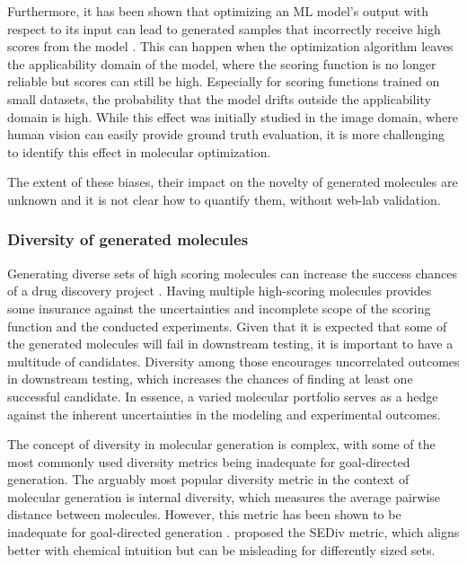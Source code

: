 Furthermore, it has been shown that optimizing an \ac{ML} model's output with respect to its input can
lead to generated samples that incorrectly receive high scores from the model
\citep{szegedyIntriguingPropertiesNeural2014,goodfellowExplainingHarnessingAdversarial2015}.
This can happen when the optimization algorithm leaves the applicability domain of the model, where
the scoring function is no longer reliable but scores can still be high. Especially for scoring
functions trained on small datasets, the probability that the model drifts outside the applicability
domain is high. While this effect was initially studied in the image domain, where human vision can easily provide
ground truth evaluation, it is more challenging to identify this effect in molecular optimization.

The extent of these biases, their impact on the novelty of generated molecules are unknown and it is
not clear how to quantify them, without web-lab validation.

\subsubsection{Diversity of generated molecules}
Generating diverse sets of high scoring molecules can increase the success chances of a drug
discovery project
\citep{martinDiverseViewpointsComputational2001,gorseDiversityMedicinalChemistry2006}. Having
multiple high-scoring molecules provides some insurance against the uncertainties and incomplete
scope of the scoring function and the conducted experiments. Given that it is expected that some of
the generated molecules will fail in downstream testing, it is important to have a multitude of
candidates. Diversity among those encourages uncorrelated outcomes in downstream testing, which
increases the chances of finding at least one successful candidate. In essence, a varied molecular
portfolio serves as a hedge against the inherent uncertainties in the modeling and experimental
outcomes.

The concept of diversity in molecular generation is complex, with some of the most commonly used
diversity metrics being inadequate for goal-directed generation. The arguably most popular
diversity metric in the context of molecular generation is internal diversity, which measures the
average pairwise distance between molecules. However, this metric has been shown to be inadequate for
goal-directed generation \citep{waldmanNovelAlgorithmsOptimization2000,xieMARSMarkovMolecular2021,thomasComparisonStructureLigandbased2021}.
\citet{thomasComparisonStructureLigandbased2021} proposed the \ac{SEDiv}
metric, which aligns better with chemical intuition but can be misleading for differently sized
sets.

